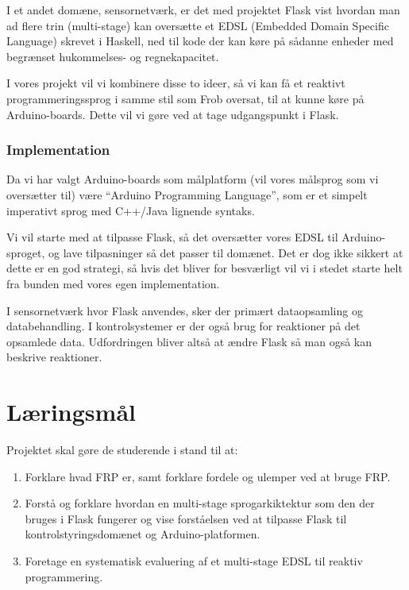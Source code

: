 \documentclass[a4paper,oneside, draft]{memoir}
\newcommand{\EDSL}{EDSL (Embedded Domain Specific Language) \renewcommand{\EDSL}{ EDSL }}
\begin{document}
I et andet domæne, sensornetværk, er det med projektet
Flask\cite{flask08} vist hvordan man ad flere trin (multi-stage) kan
oversætte et \EDSL skrevet i Haskell, ned til kode der kan køre på
sådanne enheder med begrænset hukommelses- og regnekapacitet.

I vores projekt vil vi kombinere disse to ideer, så vi kan få et reaktivt
programmeringssprog i samme stil som Frob oversat, til at kunne køre på
Arduino-boards. Dette vil vi gøre ved at tage udgangspunkt i Flask.  


\subsubsection{Implementation}
Da vi har valgt Arduino-boards som målplatform (vil vores målsprog
som vi oversætter til) være "`Arduino Programming Language"', som er et
simpelt imperativt sprog med C++/Java lignende syntaks.

Vi vil starte med at tilpasse Flask, så det oversætter vores \EDSL til
Arduino-sproget, og lave tilpasninger så det passer til domænet. Det
er dog ikke sikkert at dette er en god strategi, så hvis det bliver for
besværligt vil vi i stedet starte helt fra bunden med vores egen
implementation.

I sensornetværk hvor Flask anvendes, sker der primært dataopsamling og
databehandling. I kontrolsystemer er der også brug for reaktioner på
det opsamlede data. Udfordringen bliver altså at ændre Flask så man
også kan beskrive reaktioner.

\section{Læringsmål}

Projektet skal gøre de studerende i stand til at:

\begin{enumerate}

\item Forklare hvad FRP er, samt forklare fordele og ulemper ved at bruge FRP.

\item Forstå og forklare hvordan en multi-stage sprogarkiktektur som
  den der bruges i Flask fungerer og vise forståelsen ved at tilpasse
  Flask til kontrolstyringsdomænet og Arduino-platformen.
    
\item Foretage en systematisk evaluering af et multi-stage \EDSL til
  reaktiv programmering.
  
\end{enumerate}
\end{document}
